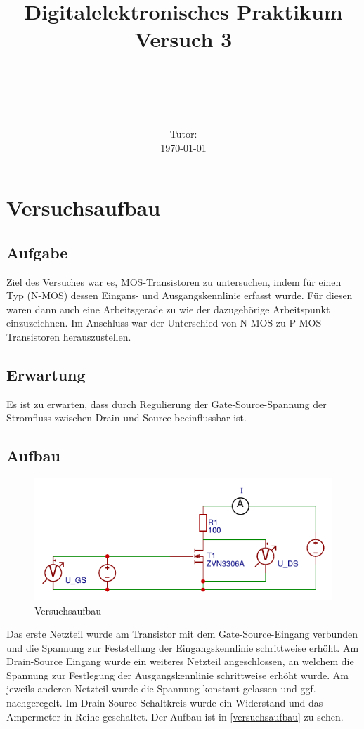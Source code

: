 \documentclass[11pt, a4paper]{article}
\title{\textbf{Digitalelektronisches Praktikum\\ Versuch 3}}
\author{\ATutantName \\ \emph{\ATutantEmail} \and \BTutantName\\ \emph{\BTutantEmail}}
\date{\Gruppennummer \\[3ex] Tutor: \Tutorname \\[3ex] \today}
\begin{document}
\clearpage
\maketitle
\thispagestyle{empty}
\newpage


\section*{Versuchsaufbau}
\subsection*{Aufgabe}
Ziel des Versuches war es, MOS-Transistoren zu untersuchen, indem für einen Typ (N-MOS) dessen Eingans- und Ausgangskennlinie erfasst wurde. Für diesen waren dann auch eine Arbeitsgerade zu wie der dazugehörige Arbeitspunkt einzuzeichnen. Im Anschluss war der Unterschied von N-MOS zu P-MOS Transistoren herauszustellen.
\subsection*{Erwartung}
Es ist zu erwarten, dass durch Regulierung der Gate-Source-Spannung der Stromfluss zwischen Drain und Source beeinflussbar ist.
\subsection*{Aufbau}
\begin{figure}
    \centering
    \includegraphics[width=\linewidth]{aufbau.pdf}
    \caption{Versuchsaufbau}
    \label{versuchsaufbau}
\end{figure}
Das erste Netzteil wurde am Transistor mit dem Gate-Source-Eingang verbunden und die Spannung zur Feststellung der Eingangskennlinie schrittweise erhöht. Am Drain-Source Eingang wurde ein weiteres Netzteil angeschlossen, an welchem die Spannung zur Festlegung der Ausgangskennlinie schrittweise erhöht wurde. Am jeweils anderen Netzteil wurde die Spannung konstant gelassen und ggf. nachgeregelt. Im Drain-Source Schaltkreis wurde ein Widerstand und das Ampermeter in Reihe geschaltet. Der Aufbau ist in \autoref{versuchsaufbau} zu sehen.
\end{document}
